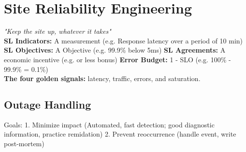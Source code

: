 \renewcommand{\chapcolor}{chSRE}
\section{Site Reliability Engineering}
\textit{"Keep the site up, whatever it takes"} \\
\textbf{SL Indicators:} A measurement (e.g. Response latency over a period of 10 min)
\textbf{SL Objectives:} A Objective (e.g. 99.9\% below 5ms)
\textbf{SL Agreements:} A economic incentive (e.g. or less bonus)
\textbf{Error Budget:} 1 - SLO (e.g. 100\% - 99.9\% = 0.1\%) \\

\textbf{The four golden signals: } latency, traffic, errors, and saturation.

\subsection{Outage Handling}
Goals: 1. Minimize impact (Automated, fast detection; good diagnostic information, practice remidation) 2. Prevent reoccurrence (handle event, write post-mortem)

